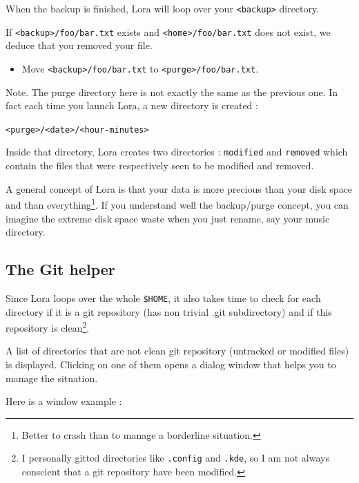 \documentclass[a4paper,12pt]{article}
\newcommand{\info}[1]{\texttt{#1}}
\begin{document}
When the backup is finished, Lora will loop over your \info{<backup>} directory.

If \info{<backup>/foo/bar.txt} exists and \info{<home>/foo/bar.txt} does not exist, we deduce that you removed your file.
\begin{itemize}
    \item 
        Move \info{<backup>/foo/bar.txt} to \info{<purge>/foo/bar.txt}.
\end{itemize}
Note. The purge directory here is not exactly the same as the previous one. In fact each time you launch Lora, a new directory is created :
\begin{center}
    \info{<purge>/<date>/<hour-minutes>}
\end{center}
Inside that directory, Lora creates two directories : \info{modified} and \info{removed} which contain the files that were respectively seen to be modified and removed.

A general concept of Lora is that your data is more precious than your disk space and than everything\footnote{Better to crash than to manage a borderline situation.}. If you understand well the backup/purge concept, you can imagine the extreme disk space waste when you just rename, say your music directory.

\subsection{The Git helper}

Since Lora loops over the whole \info{\$HOME}, it also takes time to check for each directory if it is a git repository (has non trivial .git subdirectory) and if this repository is clean\footnote{I personally gitted directories like \info{.config} and \info{.kde}, so I am not always conscient that a git repository have been modified.}.

A list of directories that are not clean git repository (untracked or modified files) is displayed. Clicking on one of them opens a dialog window that helps you to manage the situation.

Here is a window example :
\end{document}
